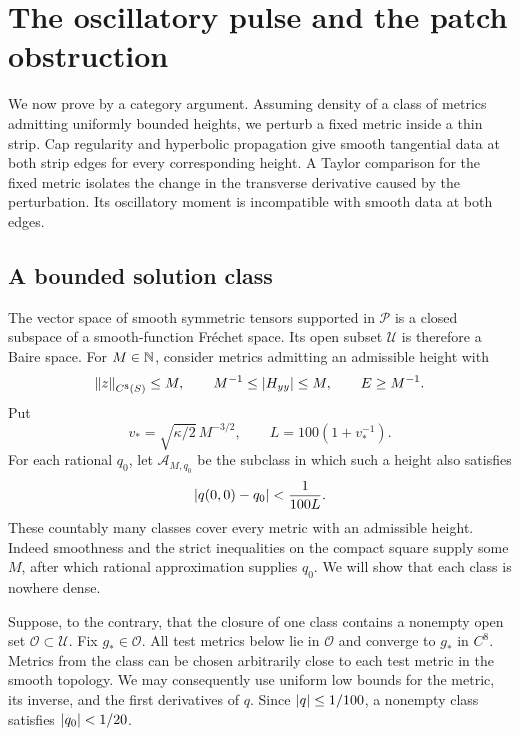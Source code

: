 \section{The oscillatory pulse and the patch obstruction}\label{sec:pulse}

We now prove  by a category argument. Assuming
density of a class of metrics admitting uniformly bounded heights,
we perturb a fixed metric inside a thin strip. Cap regularity and hyperbolic propagation give
smooth tangential data at both strip edges for every corresponding
height. A Taylor comparison for the fixed metric isolates the change
in the transverse derivative caused by the perturbation. Its
oscillatory moment is incompatible with smooth data at both edges.

\subsection{A bounded solution class}

The vector space of smooth symmetric tensors supported in
\(\mathcal P\) is a closed subspace of a smooth-function Fréchet
space. Its open subset \(\mathcal U\) is therefore a Baire space.
For \(M\in\mathbb N\), consider metrics admitting an admissible height with
\begin{equation}\label{eq:class-bounds}
\left\lVert z\right\rVert_{C^8(S)}\le M,\qquad
M^{-1}\le\left\lvert H_{yy}\right\rvert\le M,\qquad E\ge M^{-1}.
\end{equation}
Put
\begin{equation}\label{eq:speed-constants}
v_*=\sqrt{\kappa/2}\,M^{-3/2},\qquad
L=100(1+v_*^{-1}).
\end{equation}
For each rational \(q_0\), let \(\mathcal A_{M,q_0}\) be the
subclass in which such a height also satisfies
\begin{equation}\label{eq:q-class}
\left\lvert q(0,0)-q_0\right\rvert<\frac1{100L}.
\end{equation}
These countably many classes cover every metric with an admissible
height. Indeed smoothness and the strict inequalities on the compact
square supply some \(M\), after which rational approximation supplies
\(q_0\). We will show that each class is nowhere dense.

Suppose, to the contrary, that the closure of one class contains a
nonempty open set \(\mathcal O\subset\mathcal U\). Fix
\(g_*\in\mathcal O\). All test metrics below lie in \(\mathcal O\)
and converge to \(g_*\) in \(C^8\). Metrics from the class can
be chosen arbitrarily close to each test metric in the smooth
topology. We may consequently use uniform low bounds for the metric,
its inverse, and the first derivatives of \(q\).
Since \(\left\lvert q\right\rvert\le1/100\), a nonempty class satisfies
\(\left\lvert q_0\right\rvert<1/20\).

